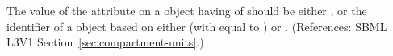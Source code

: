 The value of the attribute  on a \Compartment object having
 of  should be either 
, or the identifier of a \UnitDefinition object based on
either  (with  equal to ) or
.  (References: SBML L3V1
Section~\ref{sec:compartment-units}.)
